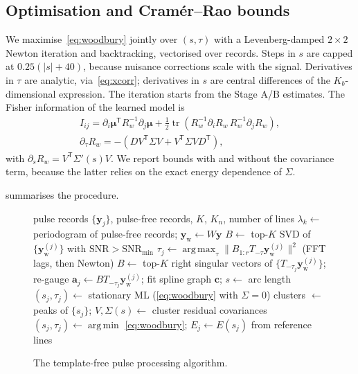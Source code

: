 \documentclass[aps,prapplied,reprint,superscriptaddress,longbibliography,nofootinbib]{revtex4-2}
\theoremstyle{remark}
\newcommand{\T}{\mathsf{T}}
\newcommand{\tr}{\operatorname{tr}}
\newcommand{\vect}[1]{\bm{#1}}
\newcommand{\Sh}[1]{T_{#1}}
\newcommand{\yw}{\vect{y}_{\mathrm w}}
\DeclareMathOperator*{\argmax}{arg\,max}
\DeclareMathOperator*{\argmin}{arg\,min}
\begin{document}
\subsection{Optimisation and Cramér--Rao bounds}
We maximise~\eqref{eq:woodbury} jointly over $(s,\tau)$ with a Levenberg-damped
$2\times2$ Newton iteration and backtracking, vectorised over records. Steps in $s$
are capped at $0.25(|s|+40)$, because nuisance corrections scale with the signal. Derivatives
in $\tau$ are analytic, via~\eqref{eq:xcorr}; derivatives in $s$ are central
differences of the $K_b$-dimensional expression. The iteration starts from the
Stage A/B estimates. The Fisher information of the learned model
is~\cite{Kay1993}
\begin{gather}
I_{ij}=\partial_i\vect\mu^\T R_w^{-1}\partial_j\vect\mu+\tfrac12\tr\!\left(R_w^{-1}
\partial_iR_w\,R_w^{-1}\partial_jR_w\right),\\
\partial_\tau R_w=-(DV^\T\Sigma V+V^\T\Sigma VD^\T),
\end{gather}
with $\partial_s R_w=V^\T\Sigma'(s)V$. We report bounds with and without the
covariance term, because the latter relies on the exact energy dependence of
$\Sigma$.

 summarises the procedure.

\begin{figure}[t]
\small
\begin{algorithmic}[1]
\Require pulse records $\{\vect y_j\}$, pulse-free records, $K$, $K_n$, number of lines
\State $\lambda_k\gets$ periodogram of pulse-free records; $\yw\gets W\vect y$ 
\State $B\gets$ top-$K$ SVD of $\{\yw^{(j)}\}$ with $\mathrm{SNR}>\mathrm{SNR}_{\min}$
\Repeat {}
  \State $\tau_j\gets\argmax_\tau\|B_{1:r}\Sh{-\tau}\yw^{(j)}\|^2$ (FFT lags, then Newton)
  \State $B\gets$ top-$K$ right singular vectors of $\{\Sh{-\tau_j}\yw^{(j)}\}$; re-gauge
\State $\vect a_j\gets B\Sh{-\tau_j}\yw^{(j)}$; fit spline graph $\vect c$; $s\gets$ arc length 
\State $(s_j,\tau_j)\gets$ stationary ML (\cref{eq:woodbury} with $\Sigma=0$)
\State clusters $\gets$ peaks of $\{s_j\}$; $V,\Sigma(s)\gets$ cluster residual covariances 
\State $(s_j,\tau_j)\gets\argmin$ \cref{eq:woodbury}; $E_j\gets E(s_j)$ from reference lines
\end{algorithmic}
\caption{The template-free pulse processing algorithm.}\label{alg:pipeline}
\end{figure}

\end{document}
